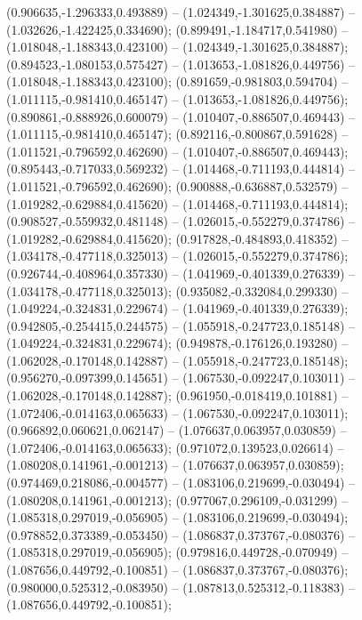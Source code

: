  (0.906635,-1.296333,0.493889) -- (1.024349,-1.301625,0.384887) -- (1.032626,-1.422425,0.334690);
 (0.899491,-1.184717,0.541980) -- (1.018048,-1.188343,0.423100) -- (1.024349,-1.301625,0.384887);
 (0.894523,-1.080153,0.575427) -- (1.013653,-1.081826,0.449756) -- (1.018048,-1.188343,0.423100);
 (0.891659,-0.981803,0.594704) -- (1.011115,-0.981410,0.465147) -- (1.013653,-1.081826,0.449756);
 (0.890861,-0.888926,0.600079) -- (1.010407,-0.886507,0.469443) -- (1.011115,-0.981410,0.465147);
 (0.892116,-0.800867,0.591628) -- (1.011521,-0.796592,0.462690) -- (1.010407,-0.886507,0.469443);
 (0.895443,-0.717033,0.569232) -- (1.014468,-0.711193,0.444814) -- (1.011521,-0.796592,0.462690);
 (0.900888,-0.636887,0.532579) -- (1.019282,-0.629884,0.415620) -- (1.014468,-0.711193,0.444814);
 (0.908527,-0.559932,0.481148) -- (1.026015,-0.552279,0.374786) -- (1.019282,-0.629884,0.415620);
 (0.917828,-0.484893,0.418352) -- (1.034178,-0.477118,0.325013) -- (1.026015,-0.552279,0.374786);
 (0.926744,-0.408964,0.357330) -- (1.041969,-0.401339,0.276339) -- (1.034178,-0.477118,0.325013);
 (0.935082,-0.332084,0.299330) -- (1.049224,-0.324831,0.229674) -- (1.041969,-0.401339,0.276339);
 (0.942805,-0.254415,0.244575) -- (1.055918,-0.247723,0.185148) -- (1.049224,-0.324831,0.229674);
 (0.949878,-0.176126,0.193280) -- (1.062028,-0.170148,0.142887) -- (1.055918,-0.247723,0.185148);
 (0.956270,-0.097399,0.145651) -- (1.067530,-0.092247,0.103011) -- (1.062028,-0.170148,0.142887);
 (0.961950,-0.018419,0.101881) -- (1.072406,-0.014163,0.065633) -- (1.067530,-0.092247,0.103011);
 (0.966892,0.060621,0.062147) -- (1.076637,0.063957,0.030859) -- (1.072406,-0.014163,0.065633);
 (0.971072,0.139523,0.026614) -- (1.080208,0.141961,-0.001213) -- (1.076637,0.063957,0.030859);
 (0.974469,0.218086,-0.004577) -- (1.083106,0.219699,-0.030494) -- (1.080208,0.141961,-0.001213);
 (0.977067,0.296109,-0.031299) -- (1.085318,0.297019,-0.056905) -- (1.083106,0.219699,-0.030494);
 (0.978852,0.373389,-0.053450) -- (1.086837,0.373767,-0.080376) -- (1.085318,0.297019,-0.056905);
 (0.979816,0.449728,-0.070949) -- (1.087656,0.449792,-0.100851) -- (1.086837,0.373767,-0.080376);
 (0.980000,0.525312,-0.083950) -- (1.087813,0.525312,-0.118383) -- (1.087656,0.449792,-0.100851);
